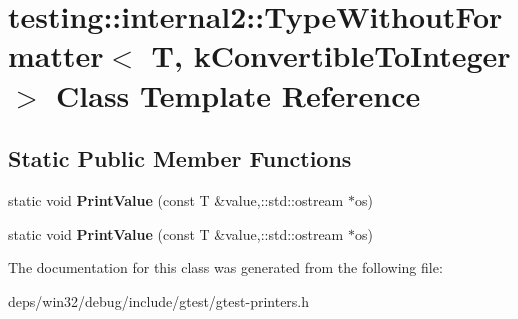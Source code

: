 \hypertarget{classtesting_1_1internal2_1_1_type_without_formatter_3_01_t_00_01k_convertible_to_integer_01_4}{}\section{testing\+:\+:internal2\+:\+:Type\+Without\+Formatter$<$ T, k\+Convertible\+To\+Integer $>$ Class Template Reference}
\label{classtesting_1_1internal2_1_1_type_without_formatter_3_01_t_00_01k_convertible_to_integer_01_4}
\subsection*{Static Public Member Functions}
\begin{DoxyCompactItemize}
\item 
\hypertarget{classtesting_1_1internal2_1_1_type_without_formatter_3_01_t_00_01k_convertible_to_integer_01_4_a6b293e13b58e50bba0e220c25e0614b7}{}static void {\bfseries Print\+Value} (const T \&value,\+::std\+::ostream $\ast$os)\label{classtesting_1_1internal2_1_1_type_without_formatter_3_01_t_00_01k_convertible_to_integer_01_4_a6b293e13b58e50bba0e220c25e0614b7}

\item 
\hypertarget{classtesting_1_1internal2_1_1_type_without_formatter_3_01_t_00_01k_convertible_to_integer_01_4_a6b293e13b58e50bba0e220c25e0614b7}{}static void {\bfseries Print\+Value} (const T \&value,\+::std\+::ostream $\ast$os)\label{classtesting_1_1internal2_1_1_type_without_formatter_3_01_t_00_01k_convertible_to_integer_01_4_a6b293e13b58e50bba0e220c25e0614b7}

\end{DoxyCompactItemize}


The documentation for this class was generated from the following file\+:\begin{DoxyCompactItemize}
\item 
deps/win32/debug/include/gtest/gtest-\/printers.\+h\end{DoxyCompactItemize}

